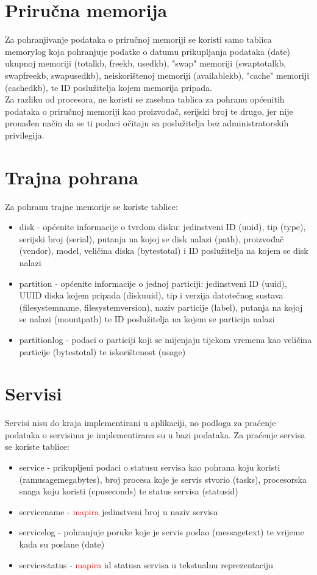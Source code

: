 \documentclass[zavrsnirad]{fer}
\begin{document}
\section{Priručna memorija}
Za pohranjivanje podataka o priručnoj memoriji se koristi samo tablica memorylog koja pohranjuje podatke o datumu prikupljanja podataka (date) ukupnoj memoriji (totalkb, freekb, usedkb), "swap" memoriji (swaptotalkb, swapfreekb, swapusedkb), neiskorištenoj memoriji (availablekb), "cache" memoriji (cachedkb), te ID poslužitelja kojem memorija pripada.
\\Za razliku od procesora, ne koristi se zasebna tablica za pohranu općenitih podataka o priručnoj memoriji kao proizvođač, serijski broj te drugo, jer nije pronađen način da se ti podaci očitaju sa poslužitelja bez administratorskih privilegija.

\section{Trajna pohrana}
Za pohranu trajne memorije se koriste tablice:
\begin{itemize}
	\item disk - općenite informacije o tvrdom disku: jedinstveni ID (uuid), tip (type), serijski broj (serial), putanja na kojoj se disk nalazi (path), proizvođač (vendor), model, veličina diska (bytestotal) i ID poslužitelja na kojem se disk nalazi
	\item partition - općenite informacije o jednoj particiji: jedinstveni ID (uuid), UUID diska kojem pripada (diskuuid), tip i verzija datotečnog sustava (filesystemname, filesystemversion), naziv particije (label), putanja na kojoj se nalazi (mountpath) te ID poslužitelja na kojem se particija nalazi
	\item partitionlog - podaci o particiji koji se mijenjaju tijekom vremena kao veličina particije (bytestotal) te iskorištenost (usage)
\end{itemize}

\section{Servisi}
Servisi nisu do kraja implementirani u aplikaciji, no podloga za praćenje podataka o servisima je implementirana su u bazi podataka. Za praćenje servisa se koriste tablice:
\begin{itemize}
	\item service - prikupljeni podaci o statusu servisa kao pohrana koju koristi (ramusagemegabytes), broj procesa koje je servis stvorio (tasks), procesorska snaga koju koristi (cpuseconds) te status servisa (statusid)
	\item servicename - \textcolor{red}{mapira} jedinstveni broj u naziv servisa
	\item servicelog - pohranjuje poruke koje je servis poslao (messagetext) te vrijeme kada su poslane (date)
	\item servicestatus - \textcolor{red}{mapira} id statusa servisa u tekstualnu reprezentaciju
\end{itemize}
\end{document}
